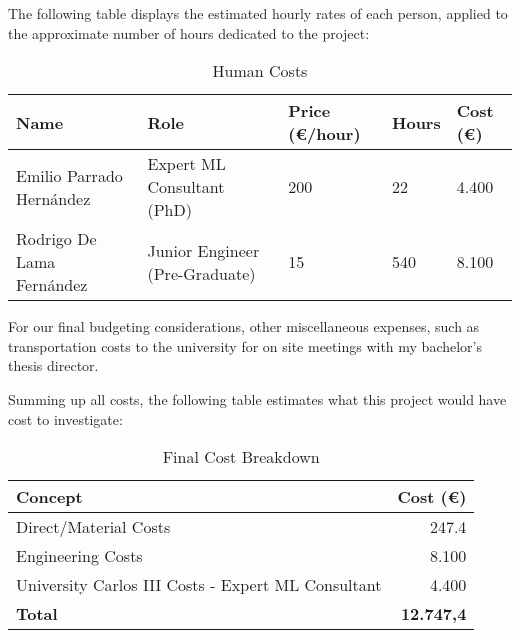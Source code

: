 \documentclass[12pt]{report} %
\begin{document}
The following table displays the estimated hourly rates of each person, applied to the approximate number of hours dedicated to the project:
            
\begin{table}[H]
	\caption{Human Costs}
	\centering
	\begin{tabular}{|P{4cm}|P{3.5cm}|P{1.8cm}|P{1.5cm}|P{1.5cm}|}
		\hline
		\textbf{Name} & \textbf{Role} & \textbf{Price (€/hour)} & \textbf{Hours} & \textbf{Cost (€)} \\
		\hline
		Emilio Parrado Hernández & Expert ML Consultant (PhD) & 200 & 22 & 4.400 \\
		\hline
		Rodrigo De Lama Fernández & Junior Engineer (Pre-Graduate) & 15 & 540 & 8.100 \\
		\hline
	\end{tabular}
\end{table}

For our final budgeting considerations, other miscellaneous expenses, such as transportation costs to the university for on site meetings with my bachelor's thesis director.

Summing up all costs, the following table estimates what this project would have cost to investigate:

\begin{table}[H]
    \caption{Final Cost Breakdown}
    \centering
    \begin{tabular}{|l|r|}
        \hline
        \textbf{Concept} & \textbf{Cost (€)} \\
        \hline
        Direct/Material Costs & 247.4 \\
        Engineering Costs & 8.100 \\
        University Carlos III Costs - Expert ML Consultant & 4.400 \\
        \hline
        \textbf{Total} & \textbf{12.747,4} \\
        \hline
    \end{tabular}
\end{table}
\end{document}
